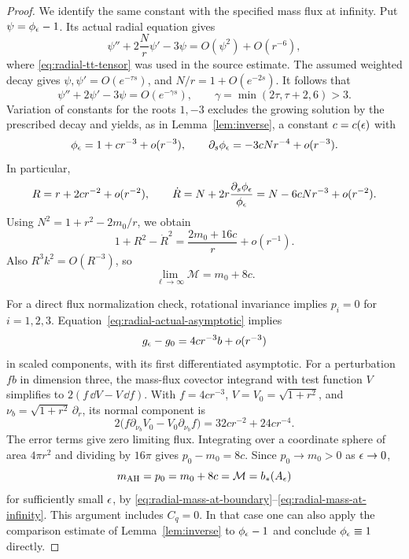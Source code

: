 \begin{proof}
We identify the same constant with the specified mass flux at infinity.
Put $\psi=\phi_\epsilon-1$.  Its actual radial equation gives
\[
 \psi''+2\frac Nr\psi'-3\psi
 =O(\psi^2)+O(r^{-6}),
\]
where \eqref{eq:radial-tt-tensor} was used in the source estimate.
The assumed weighted decay gives
$\psi,\psi'=O(e^{-\tau s})$, and $N/r=1+O(e^{-2s})$.
It follows that
\[
 \psi''+2\psi'-3\psi=O(e^{-\gamma s}),
 \qquad \gamma=\min(2\tau,\tau+2,6)>3.
\]
Variation of constants for the roots $1,-3$ excludes the growing
solution by the prescribed decay and yields, as in
Lemma~\ref{lem:inverse}, a constant $c=c(\epsilon)$ with
\begin{equation}
 \phi_\epsilon=1+cr^{-3}+o(r^{-3}),
 \qquad
 \partial_s\phi_\epsilon=-3cNr^{-4}+o(r^{-3}).
 \label{eq:radial-actual-asymptotic}
\end{equation}
In particular,
\[
 R=r+2cr^{-2}+o(r^{-2}),\qquad
 \dot R=N+2r\frac{\partial_s\phi_\epsilon}{\phi_\epsilon}
 =N-6cNr^{-3}+o(r^{-2}).
\]
Using $N^2=1+r^2-2m_0/r$, we obtain
\[
 1+R^2-\dot R^2
 =\frac{2m_0+16c}{r}+o(r^{-1}).
\]
Also $R^3k^2=O(R^{-3})$, so
\begin{equation}
 \lim_{\ell\to\infty}\mathcal M=m_0+8c.
 \label{eq:radial-mass-at-infinity}
\end{equation}

For a direct flux normalization check, rotational invariance implies
$p_i=0$ for $i=1,2,3$.
Equation~\eqref{eq:radial-actual-asymptotic} implies
\[
 g_\epsilon-g_0=4cr^{-3}b+o(r^{-3})
\]
in scaled components, with its first differentiated asymptotic.
For a perturbation $fb$ in dimension three, the mass-flux covector
integrand with test function $V$ simplifies to
$2(f\,\dd V-V\,\dd f)$.
With $f=4cr^{-3}$, $V=V_0=\sqrt{1+r^2}$, and
$\nu_b=\sqrt{1+r^2}\,\partial_r$, its normal component is
\[
 2\bigl(f\partial_{\nu_b}V_0
       -V_0\partial_{\nu_b}f\bigr)
 =32cr^{-2}+24cr^{-4}.
\]
The error terms give zero limiting flux.  Integrating over a coordinate
sphere of area $4\pi r^2$ and dividing by $16\pi$ gives
$p_0-m_0=8c$.
Since $p_0\to m_0>0$ as $\epsilon\to0$,
\[
 m_{\mathrm{AH}}=p_0=m_0+8c=\mathcal M=b_*(A_\epsilon)
\]
for sufficiently small $\epsilon$, by
\eqref{eq:radial-mass-at-boundary}--\eqref{eq:radial-mass-at-infinity}.
This argument includes $C_q=0$.  In that case one can also apply the
comparison estimate of Lemma~\ref{lem:inverse} to $\phi_\epsilon-1$
and conclude $\phi_\epsilon\equiv1$ directly.
\end{proof}

